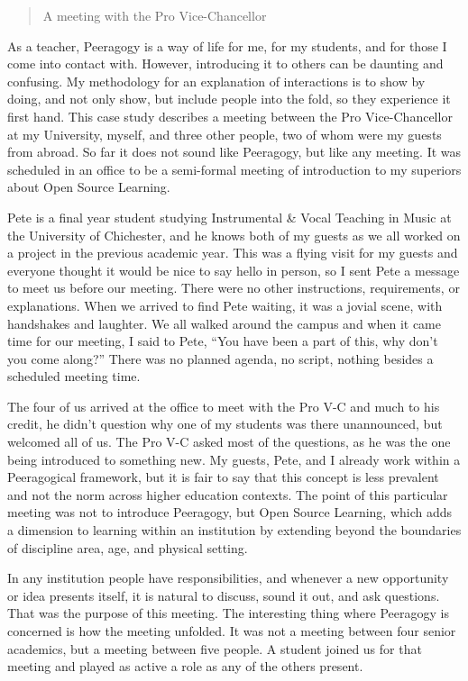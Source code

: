 \begin{quote}
A meeting with the Pro Vice-Chancellor
\end{quote}

As a teacher, Peeragogy is a way of life for me, for my students, and
for those I come into contact with. However, introducing it to others
can be daunting and confusing. My methodology for an explanation of
interactions is to show by doing, and not only show, but include people
into the fold, so they experience it first hand. This case study
describes a meeting between the Pro Vice-Chancellor at my University,
myself, and three other people, two of whom were my guests from abroad.
So far it does not sound like Peeragogy, but like any meeting. It was
scheduled in an office to be a semi-formal meeting of introduction to my
superiors about Open Source Learning.

Pete is a final year student studying Instrumental \& Vocal Teaching in
Music at the University of Chichester, and he knows both of my guests as
we all worked on a project in the previous academic year. This was a
flying visit for my guests and everyone thought it would be nice to say
hello in person, so I sent Pete a message to meet us before our meeting.
There were no other instructions, requirements, or explanations. When we
arrived to find Pete waiting, it was a jovial scene, with handshakes and
laughter. We all walked around the campus and when it came time for our
meeting, I said to Pete, ``You have been a part of this, why don't you
come along?'' There was no planned agenda, no script, nothing besides a
scheduled meeting time.

The four of us arrived at the office to meet with the Pro V-C and much
to his credit, he didn't question why one of my students was there
unannounced, but welcomed all of us. The Pro V-C asked most of the
questions, as he was the one being introduced to something new. My
guests, Pete, and I already work within a Peeragogical framework, but it
is fair to say that this concept is less prevalent and not the norm
across higher education contexts. The point of this particular meeting
was not to introduce Peeragogy, but Open Source Learning, which adds a
dimension to learning within an institution by extending beyond the
boundaries of discipline area, age, and physical setting.

In any institution people have responsibilities, and whenever a new
opportunity or idea presents itself, it is natural to discuss, sound it
out, and ask questions. That was the purpose of this meeting. The
interesting thing where Peeragogy is concerned is how the meeting
unfolded. It was not a meeting between four senior academics, but a
meeting between five people. A student joined us for that meeting and
played as active a role as any of the others present.

